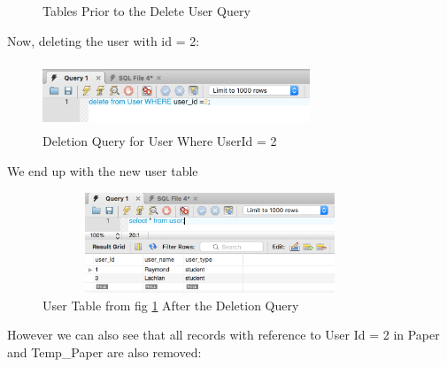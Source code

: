\documentclass[12pt, a4paper, titlepage]{book}
\begin{document}
\begin{appendices}
\begin{figure}[H]
    \caption{Tables Prior to the Delete User Query}%
    \label{fig:DBpredel}%
    \end{figure}
 \par Now, deleting the user with id = 2:
\begin{figure}[htp]
\centering
\includegraphics[width = 8cm, height = 2cm]{delquer.png}
\caption{Deletion Query for User Where UserId = 2}
\end{figure}\pagebreak
\par We end up with the new user table
\begin{figure}[H]
\centering
\includegraphics[width = 10cm, height = 3cm]{newusetable.png}
\caption{User Table from fig \ref{fig:DBpredel} After the Deletion Query}
\end{figure}
\par However we can also see that all records with reference to User Id = 2 in Paper and Temp\_Paper are also removed:
\begin{figure}[H]
\centering
{}%
    \qquad

\end{figure}
\end{appendices}
\end{document}
